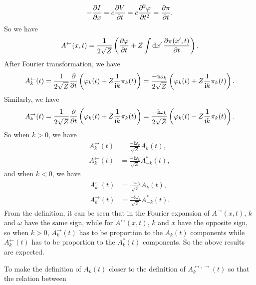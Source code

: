 \documentclass[hyperref, a4paper]{article}
\newcommand*{\ii}{\mathrm{i}}
\begin{document}
\begin{itemize}
\begin{equation}
    - \pdv{I}{x} = c \pdv{V}{t} = c \pdv[2]{\varphi}{t} = \pdv{\pi}{t}, 
\end{equation}
So we have 
\begin{equation}
    A^\leftarrow(x, t) = \frac{1}{2 \sqrt{Z}} \left( \pdv{\varphi}{t} + Z \int \dd{x'} \pdv{\pi(x', t)}{t} \right).
\end{equation}
After Fourier transformation, we have 
\begin{equation}
    A_k^\leftarrow(t) = \frac{1}{2 \sqrt{Z}} \pdv{t} \left( \varphi_k(t) + Z \frac{1}{\ii k} \pi_k(t) \right)
    = \frac{- \ii \omega_k}{2 \sqrt{Z}} \left( \varphi_k(t) + Z \frac{1}{\ii k} \pi_k(t) \right).
\end{equation}
Similarly, we have 
\begin{equation}
    A_k^\rightarrow(t) = \frac{1}{2 \sqrt{Z}} \pdv{t} \left( \varphi_k(t) + Z \frac{1}{\ii k} \pi_k(t) \right)
    = \frac{- \ii \omega_k}{2 \sqrt{Z}} \left( \varphi_k(t) - Z \frac{1}{\ii k} \pi_k(t) \right).
\end{equation}
So when $k > 0$, we have 
\begin{equation}
    \begin{aligned}
        A_k^\rightarrow(t) &= \frac{- \ii \omega_k}{\sqrt{Z}} A_k(t), \\
        A_k^\leftarrow(t) &= \frac{- \ii \omega_k}{\sqrt{Z}} A_{-k}^*(t),
    \end{aligned}
\end{equation}
and when $k < 0$, we have 
\begin{equation}
    \begin{aligned}
        A_k^\leftarrow(t) &= \frac{- \ii \omega_k}{\sqrt{Z}} A_k(t), \\
        A_k^\rightarrow(t) &= \frac{- \ii \omega_k}{\sqrt{Z}} A_{-k}^*(t).
    \end{aligned}
\end{equation}
From the definition, it can be seen that in the Fourier expansion of $A^{\rightarrow}(x, t)$,
$k$ and $\omega$ have the same sign,
while for $A^{\leftrightarrow}(x, t)$, $k$ and $x$ have the opposite sign,
so when $k>0$, $A_k^\rightarrow(t)$ has to be proportion to the $A_k(t)$ components
while $A_k^\leftarrow(t)$ has to be proportion to the $A_k^*(t)$ components.
So the above results are expected.

To make the definition of $A_k(t)$ closer to the definition of $A^{\leftrightarrow, \rightarrow}_k(t)$
so that the relation between 


\end{itemize}
\end{document}
